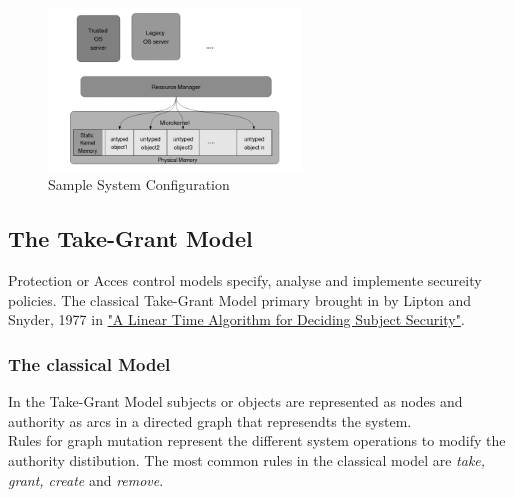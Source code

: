 \documentclass[pdftex,11pt,a4paper,twoside]{article}
\begin{document}
	\begin{figure}[ht]
	\centering
		\includegraphics[width=0.6\textwidth]{./Pictures/MemoryAllocation.png}
	\caption[Sample system architecture]{Sample System Configuration \cite{TakeG}}
	\label{fig:systarch}
	\end{figure}	
	
	\newpage
	\subsection{The Take-Grant Model}	
	Protection or Acces control models specify, analyse and implemente secureity policies. 
	The classical Take-Grant Model primary brought in by Lipton and Snyder, 1977 in  \href{https://www.cs.nmt.edu/~doshin/t/s06/cs589/pub/2.JLS-TG.pdf}{%
		"A Linear Time Algorithm for Deciding Subject Security"}.
	\subsubsection{The classical Model}
	In the Take-Grant Model \cite{TakeG} subjects or objects are represented as nodes and authority as arcs in a directed graph that represendts the system. \\ 
	Rules for graph mutation represent the different system operations to modify  the authority distibution. 
	The most common rules in the classical model are \textit{take, grant, create} and \textit{remove}. 
	
\end{document}
